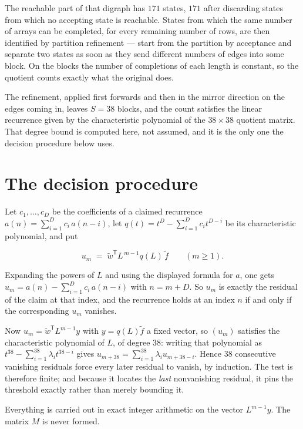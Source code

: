 \documentclass[11pt]{article}
\theoremstyle{definition}
\begin{document}
The reachable part of that digraph has $171$ states, $171$ after discarding states from which no accepting state is reachable. States from which the same number of arrays can be completed, for every remaining number of rows, are then identified by partition refinement --- start from the partition by acceptance and separate two states as soon as they send different numbers of edges into some block. On the blocks the number of completions of each length is constant, so the quotient counts exactly what the original does.

The refinement, applied first forwards and then in the mirror direction on the edges coming in, leaves $S = 38$ blocks, and the count satisfies the linear recurrence given by the characteristic polynomial of the $38 \times 38$ quotient matrix. That degree bound is computed here, not assumed, and it is the only one the decision procedure below uses.

\section{The decision procedure}

Let $c_1,\dots,c_D$ be the coefficients of a claimed recurrence $a(n) = \sum_{i=1}^{D} c_i\,a(n-i)$, let $q(t) = t^{D} - \sum_{i=1}^{D} c_i t^{D-i}$ be its characteristic polynomial, and put

\[u_m \;=\; \tilde w^{\mathsf T} L^{\,m-1} q(L)\,\tilde f \qquad (m \ge 1).\]

Expanding the powers of $L$ and using the displayed formula for $a$, one gets $u_m = a(n) - \sum_{i=1}^{D} c_i\,a(n-i)$ with $n = m + D$. So $u_m$ is exactly the residual of the claim at that index, and the recurrence holds at an index $n$ if and only if the corresponding $u_m$ vanishes.

Now $u_m = \tilde w^{\mathsf T} L^{m-1} y$ with $y = q(L)\tilde f$ a fixed vector, so $(u_m)$ satisfies the characteristic polynomial of $L$, of degree $38$: writing that polynomial as $t^{38} - \sum_{i=1}^{38} \lambda_i t^{38-i}$ gives $u_{m+38} = \sum_{i=1}^{38} \lambda_i u_{m+38-i}$. Hence $38$ consecutive vanishing residuals force every later residual to vanish, by induction. The test is therefore finite; and because it locates the {\itshape last} nonvanishing residual, it pins the threshold exactly rather than merely bounding it.

Everything is carried out in exact integer arithmetic on the vector $L^{m-1}y$. The matrix $M$ is never formed.
\end{document}
